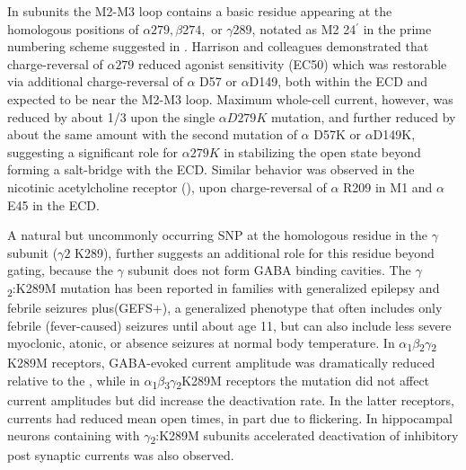 \documentclass[journal=jacsat,manuscript=article]{achemso}
\begin{document}
In \GABAA subunits the M2-M3 loop contains a basic residue appearing at the homologous positions of $\alpha279, \beta274,$ or $\gamma289$, notated as M2 24$^{\prime}$ in the prime numbering scheme suggested in \cite{Jaiteh2016}.  Harrison and colleagues\cite{Kash2003} demonstrated that charge-reversal of $\alpha279$ reduced agonist sensitivity (EC50) which was restorable via additional charge-reversal of $\alpha$ D57 or $\alpha$D149, both within the ECD and expected to be near the M2-M3 loop.  Maximum whole-cell current, however, was reduced by about 1/3 upon the single $\alpha D279K$ mutation, and further reduced by about the same amount with the second mutation of $\alpha$ D57K or $\alpha$D149K, suggesting a significant role for $\alpha279K$ in stabilizing the open state beyond forming a salt-bridge with the ECD.  Similar behavior was observed in the nicotinic acetylcholine receptor (\nachr), upon charge-reversal of  $\alpha$ R209 in M1 and $\alpha$ E45 in the ECD.\cite{Lee2005}  

A natural but uncommonly occurring SNP at the homologous residue in the $\gamma$ subunit ($\gamma2$ K289), further suggests an additional role for this residue beyond gating, because the $\gamma$ subunit does not form GABA binding cavities. The \(\gamma\)\textsubscript{2}:K289M mutation has been reported in families with generalized epilepsy and febrile seizures plus(GEFS+)\cite{Mac2010,Baulac2001,Bianchi2002}, a generalized phenotype that often includes only febrile (fever-caused) seizures until about age 11, but can also include less severe myoclonic, atonic, or absence seizures at normal body temperature.  In \(\alpha\)\textsubscript{1}\(\beta\)\textsubscript{2}\(\gamma\)\textsubscript{2} K289M receptors, GABA-evoked current amplitude was dramatically reduced relative to the \WT \cite{Baulac2001,Ramakrishnan2004}, while in \(\alpha\)\textsubscript{1}\(\beta\)\textsubscript{3}\(\gamma\)\textsubscript{2}K289M receptors the mutation did not affect current amplitudes but did increase the deactivation rate\cite{Eugene2007}. In the latter receptors, currents had reduced mean open times, in part due to flickering\cite{Bianchi2002,Macdonald2006,Hales2006}. In hippocampal neurons containing \GABAA with \(\gamma\)\textsubscript{2}:K289M subunits %
accelerated deactivation of inhibitory post synaptic currents was also observed\cite{Eugene2007}.
\end{document}
